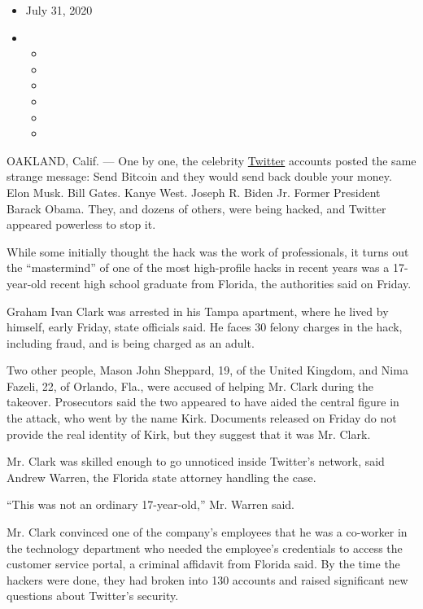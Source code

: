 \begin{itemize}
\item
  July 31, 2020
\item
  \begin{itemize}
  \item
  \item
  \item
  \item
  \item
  \item
  \end{itemize}
\end{itemize}

OAKLAND, Calif. --- One by one, the celebrity
\href{https://www.nytimes3xbfgragh.onion/2020/08/03/technology/ftc-twitter-privacy-violations.html}{Twitter}
accounts posted the same strange message: Send Bitcoin and they would
send back double your money. Elon Musk. Bill Gates. Kanye West. Joseph
R. Biden Jr. Former President Barack Obama. They, and dozens of others,
were being hacked, and Twitter appeared powerless to stop it.

While some initially thought the hack was the work of professionals, it
turns out the ``mastermind'' of one of the most high-profile hacks in
recent years was a 17-year-old recent high school graduate from Florida,
the authorities said on Friday.

Graham Ivan Clark was arrested in his Tampa apartment, where he lived by
himself, early Friday, state officials said. He faces 30 felony charges
in the hack, including fraud, and is being charged as an adult.

Two other people, Mason John Sheppard, 19, of the United Kingdom, and
Nima Fazeli, 22, of Orlando, Fla., were accused of helping Mr. Clark
during the takeover. Prosecutors said the two appeared to have aided the
central figure in the attack, who went by the name Kirk. Documents
released on Friday do not provide the real identity of Kirk, but they
suggest that it was Mr. Clark.

Mr. Clark was skilled enough to go unnoticed inside Twitter's network,
said Andrew Warren, the Florida state attorney handling the case.

``This was not an ordinary 17-year-old,'' Mr. Warren said.

Mr. Clark convinced one of the company's employees that he was a
co-worker in the technology department who needed the employee's
credentials to access the customer service portal, a criminal affidavit
from Florida said. By the time the hackers were done, they had broken
into 130 accounts and raised significant new questions about Twitter's
security.

